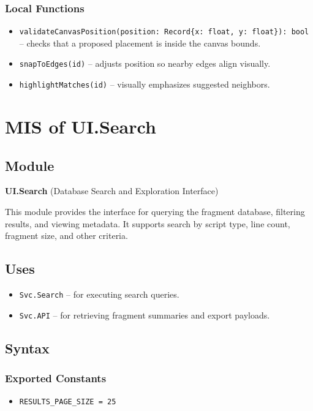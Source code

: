 \documentclass[12pt, titlepage]{article}
\begin{document}
\subsubsection{Local Functions}
\begin{itemize}
    \item \texttt{validateCanvasPosition(position: Record\{x: float, y: float\}): bool} – checks that a proposed placement is inside the canvas bounds.
    \item \texttt{snapToEdges(id)} – adjusts position so nearby edges align visually.
    \item \texttt{highlightMatches(id)} – visually emphasizes suggested neighbors.
\end{itemize}



\section{MIS of UI.Search} \label{UI.Search}

\subsection{Module}
\textbf{UI.Search} \; (Database Search and Exploration Interface)

This module provides the interface for querying the fragment database, filtering results, and viewing metadata. It supports search by script type, line count, fragment size, and other criteria.

\subsection{Uses}
\begin{itemize}
    \item \texttt{Svc.Search} – for executing search queries.
    \item \texttt{Svc.API} – for retrieving fragment summaries and export payloads.
\end{itemize}

\subsection{Syntax}

\subsubsection{Exported Constants}
\begin{itemize}
    \item \texttt{RESULTS\_PAGE\_SIZE = 25}
\end{itemize}
\end{document}
